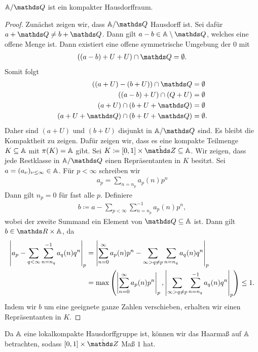\begin{prop}
$\A/\Q$ ist ein kompakter Hausdorffraum.
\end{prop}
\begin{proof}
Zunächst zeigen wir, dass $\A/\Q$ Hausdorff ist.
Sei dafür $a+\Q\not = b+\Q$. Dann gilt $a-b \in \mathbb{A}\setminus \Q$, welches eine offene Menge ist.
Dann existiert eine offene symmetrische Umgebung der $0$ mit
\begin{align*}
((a-b)+U+U)\cap \Q=\emptyset.
\end{align*}
Somit folgt
\begin{align*}
((a+U)-(b+U))\cap \Q &= \emptyset\\
((a-b)+U)\cap (Q+ U)&=\emptyset\\
(a+U)\cap (b+U+\Q)&=\emptyset\\
(a+U+\Q)\cap (b+U+\Q)&=\emptyset.
\end{align*}
Daher sind $(a+U)$ und $(b+U)$ disjunkt in $\A/\Q$ sind.
Es bleibt die Kompaktheit zu zeigen.
Dafür zeigen wir, dass es eine kompakte Teilmenge $K \subseteq \mathbb{A}$ mit $\pi(K)=\mathbb{A}$ gibt.
Sei $K\coloneqq [0,1]\times \hat{\Z}\subseteq \A$.
Wir zeigen, dass jede Restklasse in $\A/\Q$ einen Repräsentanten in $K$ besitzt.
Sei $a=(a_\nu)_{\nu \leq \infty} \in \mathbb{A}$. Für $p<\infty$ schreiben wir
\begin{align*}
a_p=\sum_{n=n_p} a_p(n)p^n
\end{align*}
Dann gilt $n_p=0$ für fast alle $p$.
Definiere
\begin{align*}
b\coloneqq a- \sum_{p<\infty}\sum_{n=n_p}^{-1} a_p(n)p^n,
\end{align*}
wobei der zweite Summand ein Element von $\Q \subseteq \A$ ist.
Dann gilt $b \in \R \times \A$, da
\begin{align*}
\left\vert a_p-\sum_{q<\infty} \sum_{n=n_q}^{-1} a_q(n)q^n\right\vert_p&
=\left\vert\sum_{n=0}^\infty a_p(n)p^n-\sum_{\infty>q\not =p} \sum_{n=n_q} a_q(n)q^n\right\vert_p\\
&=\max \left(\left\vert\sum_{n=0}^\infty a_p(n)p^n\right\vert_p,\left\vert\sum_{\infty>q\not =p} \sum_{n=n_q}^{-1} a_q(n)q^n\right\vert_p\right) \leq 1.
\end{align*}
Indem wir $b$ um eine geeignete ganze Zahlen verschieben, erhalten wir einen Repräsentanten in $K$.
\end{proof}

Da $\mathbb{A}$ eine lokalkompakte Hausdorffgruppe ist, können wir das Haarmaß auf $\mathbb{A}$ betrachten, sodass $[0,1]\times \hat{\Z}$ Maß $1$ hat.

